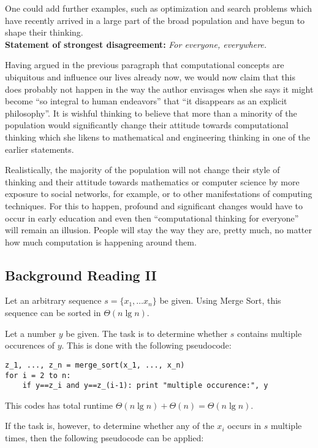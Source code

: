 \documentclass[a4paper]{article}
\begin{document}
One could add further examples, such as optimization and search
problems which have recently arrived in a large part of the broad population and
have begun to shape their thinking.
\\

{\bf Statement of strongest disagreement:} {\it For everyone, everywhere.}

Having argued in the previous paragraph that computational concepts are
ubiquitous and influence our lives already now, we would now claim that this
does probably not happen in the way the author envisages when she says
it might become ``so integral to human
endeavors'' that ``it disappears as an explicit philosophy''. It is wishful
thinking to believe that more than a minority of the population would
significantly change their attitude towards computational thinking which she
likens to mathematical and engineering thinking in one of the earlier
statements.

Realistically, the majority of the population will not change their style of
thinking and their attitude towards mathematics or computer science by more
exposure to social networks, for example, or to other manifestations of
computing techniques. For this to happen, profound and significant changes would have to
occur in early education and even then ``computational thinking for everyone''
will remain an illusion. People will stay the way they are, pretty much, no
matter how much computation is happening around them.

\subsection{Background Reading II}

Let an arbitrary sequence $s = \{x_1, \ldots x_n\}$ be given. Using Merge Sort,
this sequence can be sorted in $\Theta(n \lg n)$.

Let a number $y$ be given. The task is to determine whether $s$ contains
multiple occurences of $y$. This is done with the following pseudocode:

\begin{verbatim}
z_1, ..., z_n = merge_sort(x_1, ..., x_n)
for i = 2 to n:
    if y==z_i and y==z_(i-1): print "multiple occurence:", y
\end{verbatim}

This codes has total runtime $\Theta(n \lg n) + \Theta(n) = \Theta(n \lg n)$.

If the task is, however, to determine whether any of the $x_i$ occurs 
in $s$ multiple times, then the following pseudocode can be applied:
\end{document}

